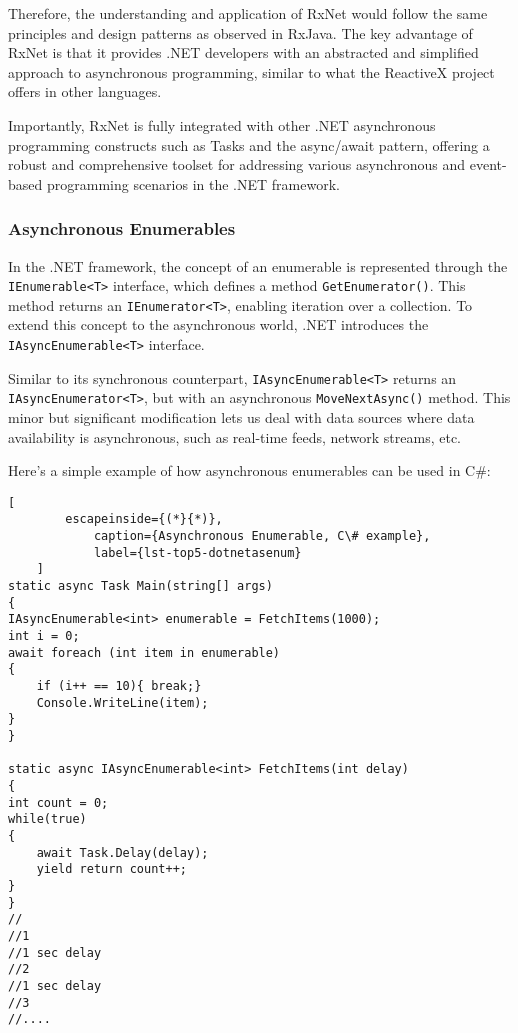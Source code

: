 Therefore, the understanding and application of RxNet would follow the same principles and design patterns as observed in RxJava. The key advantage of RxNet is that it provides .NET developers with an abstracted and simplified approach to asynchronous programming, similar to what the ReactiveX project offers in other languages.

Importantly, RxNet is fully integrated with other .NET asynchronous programming constructs such as Tasks and the async/await pattern, offering a robust and comprehensive toolset for addressing various asynchronous and event-based programming scenarios in the .NET framework.

\subsubsection{Asynchronous Enumerables}
\label{csenums}
In the .NET framework, the concept of an enumerable is represented through the \texttt{IEnumerable<T>} interface, which defines a method \texttt{GetEnumerator()}. This method returns an \texttt{IEnumerator<T>}, enabling iteration over a collection. To extend this concept to the asynchronous world, .NET introduces the \texttt{IAsyncEnumerable<T>} interface.

Similar to its synchronous counterpart, \texttt{IAsyncEnumerable<T>} returns an \texttt{IAsyncEnumerator<T>}, but with an asynchronous \texttt{MoveNextAsync()} method. This minor but significant modification lets us deal with data sources where data availability is asynchronous, such as real-time feeds, network streams, etc.

Here's a simple example of how asynchronous enumerables can be used in C\#:

\begin{center}
	\lstset{basicstyle=\scriptsize\ttfamily,frame=bottomline}
	\begin{lstlisting}[
		escapeinside={(*}{*)},
			caption={Asynchronous Enumerable, C\# example},
			label={lst-top5-dotnetasenum}
	]
static async Task Main(string[] args)
{
IAsyncEnumerable<int> enumerable = FetchItems(1000);
int i = 0;
await foreach (int item in enumerable)
{
	if (i++ == 10){ break;}
	Console.WriteLine(item);
}
}

static async IAsyncEnumerable<int> FetchItems(int delay)
{
int count = 0;
while(true)
{
	await Task.Delay(delay);
	yield return count++;
}
}
//
//1
//1 sec delay
//2
//1 sec delay
//3
//....
	\end{lstlisting}
\end{center}

